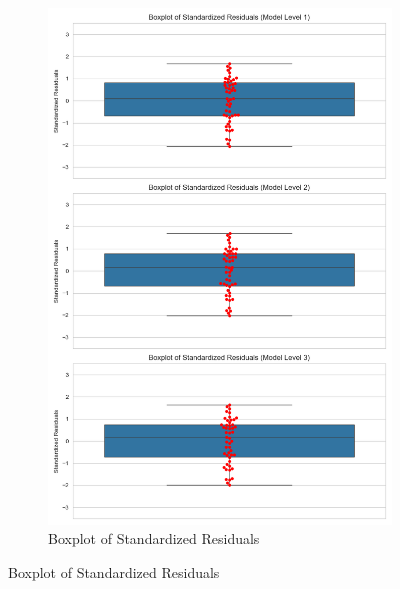 \documentclass[11pt, oneside]{article}   	%
\begin{document}
\begin{figure}[H]
\begin{subfigure}{.5\textwidth}
  \includegraphics[width=\linewidth]{../plots/full_data/hierarchy8/std_residuals}
  \caption{Boxplot of Standardized Residuals}
\end{subfigure}
\end{figure}
\end{document}
